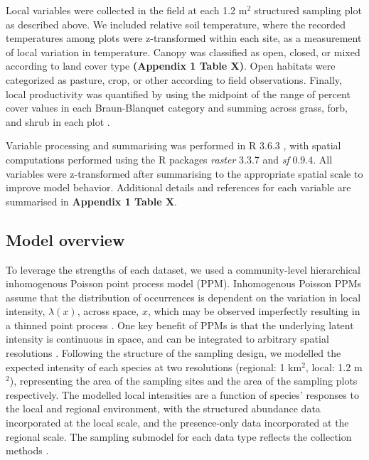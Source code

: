 \documentclass[preprint,review,times,12pt]{elsarticle}
\begin{document}
Local variables were collected in the field at each 1.2 m$^2$ structured sampling plot as described above. We included relative soil temperature, where the recorded temperatures among plots were z-transformed within each site, as a measurement of local variation in temperature. Canopy was classified as open, closed, or mixed according to land cover type \textbf{(Appendix 1 Table X)}. Open habitats were categorized as pasture, crop, or other according to field observations. Finally, local productivity was quantified by using the midpoint of the range of percent cover values in each Braun-Blanquet category and summing across grass, forb, and shrub in each plot \citep{Douglas1978,Mccain2018,Szewczyk2018}.

Variable processing and summarising was performed in R 3.6.3 \citep{R-3-6-3}, with spatial computations performed using the R packages \emph{raster} 3.3.7 and \emph{sf} 0.9.4. All variables were z-transformed after summarising to the appropriate spatial scale to improve model behavior. Additional details and references for each variable are summarised in \textbf{Appendix 1 Table X}.


\subsection{Model overview}
To leverage the strengths of each dataset, we used a community-level hierarchical inhomogenous Poisson point process model (PPM). Inhomogenous Poisson PPMs assume that the distribution of occurrences is dependent on the variation in local intensity, $\lambda(x)$, across space, $x$, which may be observed imperfectly resulting in a thinned point process \citep{Warton2010,Baddeley2015,Fithian2015}. One key benefit of PPMs is that the underlying latent intensity is continuous in space, and can be integrated to arbitrary spatial resolutions \citep{Renner2015,Hefley2016,Koshkina2017a,Fletcher2019}. Following the structure of the sampling design, we modelled the expected intensity of each species at two resolutions (regional: 1 km$^2$, local: 1.2 m$^2$), representing the area of the sampling sites and the area of the sampling plots respectively. The modelled local intensities are a function of species' responses to the local and regional environment, with the structured abundance data incorporated at the local scale, and the presence-only data incorporated at the regional scale. The sampling submodel for each data type reflects the collection methods \citep{Isaac2014,Hefley2016,Fletcher2019,Miller2019}.
\end{document}
